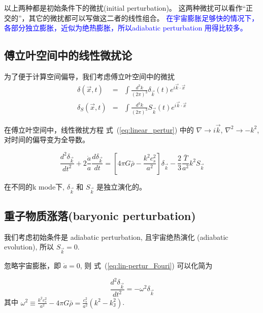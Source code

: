 \documentclass[12pt]{ctexart}
\newcommand{\new}[1]{\textcolor{blue}{#1}}
\newcommand{\refeq}[1]{式~(\ref{#1})}
\begin{document}
以上两种都是初始条件下的微扰(initial perturbation)。
这两种微扰可以看作“正交的”，其它的微扰都可以写做这二者的线性组合。
\new{在宇宙膨胀足够快的情况下，各部分独立膨胀，近似为绝热膨胀，所以adiabatic perturbation 用得比较多。}

\subsection{傅立叶空间中的线性微扰论}

为了便于计算空间偏导，我们考虑傅立叶空间中的微扰
\begin{eqnarray}
    \delta\left(\vec{x},t\right) &=& \int \frac{d^3k}{(2\pi)^3} \delta_{\vec{k}}\left(t\right) e^{i\vec{k}\cdot \vec{x}} \\ 
    \delta_S\left(\vec{x},t\right) &=& \int \frac{d^3k}{(2\pi)^3} S_{\vec{k}}\left(t\right) e^{i\vec{k}\cdot \vec{x}}
\end{eqnarray}
\begin{equation}
\end{equation}

在傅立叶空间中，线性微扰方程 \refeq{eq:linear_pertur} 中的 $\nabla \rightarrow i\vec{k}$, $\nabla^2 \rightarrow -k^2$, 对时间的偏导变为全导数。
\begin{shaded}
\begin{equation} \label{eq:lin-pertur_Fouri}
    \frac{d^2 \delta_{\vec{k}}}{dt^2 } + 2\frac{\dot{a}}{a} \frac{d\delta_{\vec{k}}}{dt} = \left[4\pi G \bar{\rho}-\frac{k^2c_s^2}{a^2}\right] \delta_{\vec{k}} -\frac{2}{3}\frac{\bar{T}}{a^2}k^2 S_{\vec{k}}
\end{equation}
\end{shaded}
在不同的k mode下,  $\delta_{\vec{k}}$ 和 $S_{\vec{k}}$ 是独立演化的。

\subsection{重子物质涨落(baryonic perturbation)}
 
我们考虑初始条件是 adiabatic perturbation, 且宇宙绝热演化 (adiabatic evolution), 所以  $S_{\vec{k}}=0$.

忽略宇宙膨胀，即 $\dot{a}=0$, 则 \refeq{eq:lin-pertur_Fouri} 可以化简为

\begin{equation}
    \frac{d^2 \delta_{\vec{k}}}{dt^2} = -\omega^2 \delta_{\vec{k}}
\end{equation}
其中 $\omega^2 \equiv \frac{k^2 c_s^2}{a^2} - 4\pi G \bar{\rho} = \frac{c_s^2}{a^2}\left(k^2 - k_\text{J}^2\right)$. 
\end{document}
